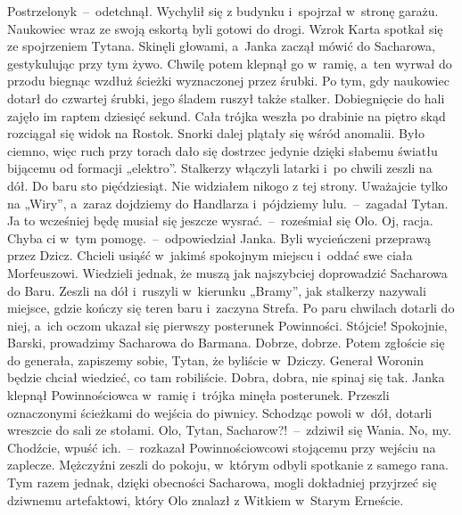 \documentclass[../MAIN.tex]{subfiles}
\begin{document}
\sx Postrzelony\3k~--~odetchnął.
\qm
Wychylił się z budynku i~spojrzał w~stronę garażu. Naukowiec wraz ze swoją eskortą byli gotowi do drogi. Wzrok Karta spotkał się ze spojrzeniem Tytana. Skinęli głowami, a~Janka zaczął mówić do Sacharowa, gestykulując przy tym żywo. Chwilę potem klepnął go w~ramię, a~ten wyrwał do przodu biegnąc wzdłuż ścieżki wyznaczonej przez śrubki. Po tym, gdy naukowiec dotarł do czwartej śrubki, jego śladem ruszył także stalker. Dobiegnięcie do hali zajęło im raptem dziesięć sekund. Cała trójka weszła po drabinie na piętro skąd rozciągał się widok na Rostok. Snorki dalej plątały się wśród anomalii. Było ciemno, więc ruch przy torach dało się dostrzec jedynie dzięki słabemu światłu bijącemu od formacji „elektro”. Stalkerzy włączyli latarki i~po chwili zeszli na dół.
%
\sx Do baru sto pięćdziesiąt. Nie widziałem nikogo z tej strony. Uważajcie tylko na „Wiry”, a~zaraz dojdziemy do Handlarza i~pójdziemy lulu.~--~zagadał Tytan.
\xx Ja to wcześniej będę musiał się jeszcze wysrać.~--~roześmiał się Olo.
\xx Oj, racja. Chyba ci w~tym pomogę.~--~odpowiedział Janka.
\qm
Byli wycieńczeni przeprawą przez Dzicz. Chcie\-li usiąść w~jakimś spokojnym miejscu i~oddać swe ciała Morfeuszowi. Wiedzieli jednak, że muszą jak najszybciej doprowadzić Sacharowa do Baru. Zeszli na dół i~ruszyli w~kierunku „Bramy”, jak stalkerzy nazywali miejsce, gdzie kończy się teren baru i~zaczyna Strefa. Po paru chwilach dotarli do niej, a~ich oczom ukazał się pierwszy posterunek Powinności.
\sx Stójcie!
\xx Spokojnie, Barski, prowadzimy Sacharowa do Barmana.
\xx Dobrze, dobrze. Potem zgłoście się do generała, zapiszemy sobie, Tytan, że byliście w~Dziczy. Generał Woronin będzie chciał wiedzieć, co tam robiliście.
\xx Dobra, dobra, nie spinaj się tak.
\qm
Janka klepnął Powinnościowca w~ramię i~trójka minęła posterunek. Przeszli oznaczonymi ścieżkami do wejścia do piwnicy. Schodząc powoli w~dół, dotarli wreszcie do sali ze stołami.
\sx Olo, Tytan, Sacharow?!~--~zdziwił się Wania.
\xx No, my.
\xx Chodźcie, wpuść ich.~--~rozkazał Powinnościowcowi stojącemu przy wejściu na zaplecze.
\qm
Mężczyźni zeszli do pokoju, w~którym odbyli spotkanie z samego rana. Tym razem jednak, dzięki obecności Sacharowa, mogli dokładniej przyjrzeć się dziwnemu artefaktowi, który Olo znalazł z Witkiem w~Starym Erneście.
\end{document}
